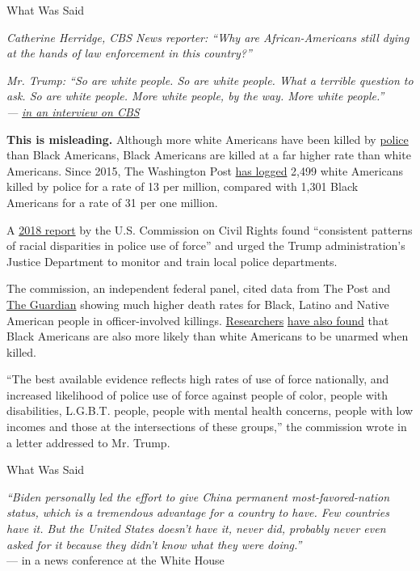 What Was Said

\emph{Catherine Herridge, CBS News reporter: ``Why are African-Americans
still dying at the hands of law enforcement in this country?''}

\emph{Mr. Trump: ``So are white people. So are white people. What a
terrible question to ask. So are white people. More white people, by the
way. More white people.''}\\
\emph{---} \href{https://www.youtube.com/watch?v=pyJUmK3fUTs}{\emph{in
an interview on CBS}}

\textbf{This is misleading.} Although more white Americans have been
killed by
\href{https://www.nytimes3xbfgragh.onion/2020/08/19/us/politics/democrats-biden-defund-police.html}{police}
than Black Americans, Black Americans are killed at a far higher rate
than white Americans. Since 2015, The Washington Post
\href{https://www.washingtonpost.com/graphics/investigations/police-shootings-database/}{has
logged} 2,499 white Americans killed by police for a rate of 13 per
million, compared with 1,301 Black Americans for a rate of 31 per one
million.

A \href{https://www.usccr.gov/pubs/2018/11-15-Police-Force.pdf}{2018
report} by the U.S. Commission on Civil Rights found ``consistent
patterns of racial disparities in police use of force'' and urged the
Trump administration's Justice Department to monitor and train local
police departments.

The commission, an independent federal panel, cited data from The Post
and
\href{https://www.theguardian.com/us-news/series/counted-us-police-killings}{The
Guardian} showing much higher death rates for Black, Latino and Native
American people in officer-involved killings.
\href{https://policeviolencereport.org/}{Researchers}
\href{https://journals.plos.org/plosone/article?id=10.1371/journal.pone.0141854}{have
also found} that Black Americans are also more likely than white
Americans to be unarmed when killed.

``The best available evidence reflects high rates of use of force
nationally, and increased likelihood of police use of force against
people of color, people with disabilities, L.G.B.T. people, people with
mental health concerns, people with low incomes and those at the
intersections of these groups,'' the commission wrote in a letter
addressed to Mr. Trump.

What Was Said

\emph{``Biden personally led the effort to give China permanent
most-favored-nation status, which is a tremendous advantage for a
country to have. Few countries have it. But the United States doesn't
have it, never did, probably never even asked for it because they didn't
know what they were doing.''}\\
--- in a news conference at the White House

